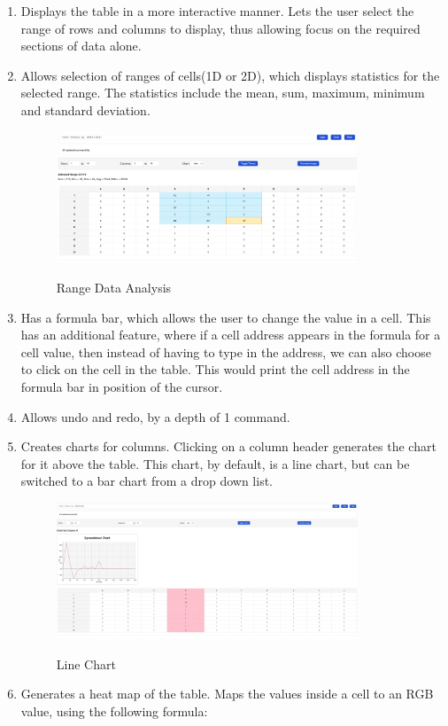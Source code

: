 \documentclass{article}
\begin{document}
\begin{enumerate}
    \item Displays the table in a more interactive manner. Lets the user select the range of rows and columns to display, thus allowing focus on the required sections of data alone.
    \item Allows selection of ranges of cells(1D or 2D), which displays statistics for the selected range. The statistics include the mean, sum, maximum, minimum and standard deviation.
    \begin{figure}[t]
    \centering
    {{\includegraphics[width=9cm]{range.jpg}}}
    \caption{Range Data Analysis}
    \end{figure}
    \item Has a formula bar, which allows the user to change the value in a cell. This has an additional feature, where if a cell address appears in the formula for a cell value, then instead of having to type in the address, we can also choose to click on the cell in the table. This would print the cell address in the formula bar in position of the cursor.
    \item Allows undo and redo, by a depth of 1 command.
    \item Creates charts for columns. Clicking on a column header generates the chart for it above the table. This chart, by default, is a line chart, but can be switched to a bar chart from a drop down list.
    \begin{figure}[t]
    \centering
    {{\includegraphics[width=9cm]{graph.jpg}}}
    \caption{Line Chart}
    \end{figure}
    \item Generates a heat map of the table. Maps the values inside a cell to an RGB value, using the following formula:

\end{enumerate}
\end{document}
